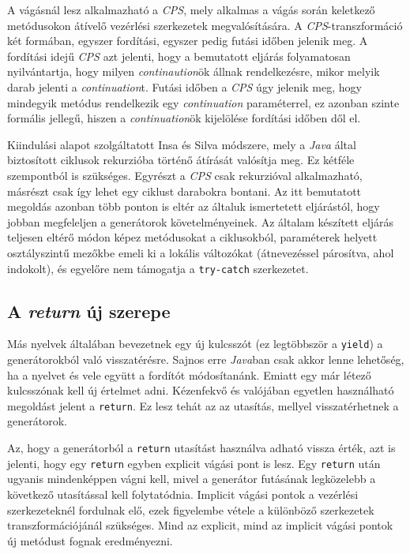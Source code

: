 A vágásnál lesz alkalmazható a \textit{CPS}, mely alkalmas a vágás során keletkező metódusokon átívelő vezérlési szerkezetek megvalósítására. A \textit{CPS}-transzformáció két formában, egyszer fordítási, egyszer pedig futási időben jelenik meg. A fordítási idejű \textit{CPS} azt jelenti, hogy a bemutatott eljárás folyamatosan nyilvántartja, hogy milyen \textit{continaution}ök állnak rendelkezésre, mikor melyik darab jelenti a \textit{continuation}t. Futási időben a \textit{CPS} úgy jelenik meg, hogy mindegyik metódus rendelkezik egy \textit{continuation} paraméterrel, ez azonban szinte formális jellegű, hiszen a \textit{continuation}ök kijelölése fordítási időben dől el.

Kiindulási alapot szolgáltatott Insa és Silva \citeyear{IterToRec} módszere, mely a \textit{Java} által biztosított ciklusok rekurzióba történő átírását valósítja meg. Ez kétféle szempontból is szükséges. Egyrészt a \textit{CPS} csak rekurzióval alkalmazható, másrészt csak így lehet egy ciklust darabokra bontani. Az itt bemutatott megoldás azonban több ponton is eltér az általuk ismertetett eljárástól, hogy jobban megfeleljen a generátorok követelményeinek. Az általam készített eljárás teljesen eltérő módon képez metódusokat a ciklusokból, paraméterek helyett osztályszintű mezőkbe emeli ki a lokális változókat (átnevezéssel párosítva, ahol indokolt), és egyelőre nem támogatja a \texttt{try-catch} szerkezetet.

\subsection{A \textit{return} új szerepe}

Más nyelvek általában bevezetnek egy új kulcsszót (ez legtöbbször a \texttt{yield}) a generátorokból való visszatérésre. Sajnos erre \textit{Java}ban csak akkor lenne lehetőség, ha a nyelvet és vele együtt a fordítót módosítanánk. Emiatt egy már létező kulcsszónak kell új értelmet adni. Kézenfekvő és valójában egyetlen használható megoldást jelent a \texttt{return}. Ez lesz tehát az az utasítás, mellyel visszatérhetnek a generátorok.

Az, hogy a generátorból a \texttt{return} utasítást használva adható vissza érték, azt is jelenti, hogy egy \texttt{return} egyben explicit vágási pont is lesz. Egy \texttt{return} után ugyanis mindenképpen vágni kell, mivel a generátor futásának legközelebb a következő utasítással kell folytatódnia. Implicit vágási pontok a vezérlési szerkezeteknél fordulnak elő, ezek figyelembe vétele a különböző szerkezetek transzformációjánál szükséges. Mind az explicit, mind az implicit vágási pontok új metódust fognak eredményezni.

